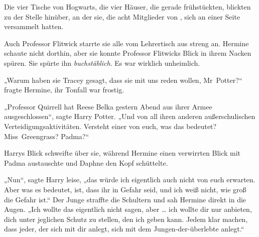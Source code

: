 Die vier Tische von Hogwarts, die vier Häuser, die gerade frühstückten, blickten zu der Stelle hinüber, an der sie, die acht Mitglieder von \SPHEW, sich an einer Seite versammelt hatten.

Auch Professor Flitwick starrte sie alle vom Lehrertisch aus streng an. Hermine schaute nicht dorthin, aber sie konnte Professor Flitwicks Blick in ihrem Nacken spüren. Sie spürte ihn \emph{buchstäblich}. Es war wirklich unheimlich.

„Warum haben sie Tracey gesagt, dass sie mit uns reden wollen, Mr~Potter?“ fragte Hermine, ihr Tonfall war frostig.

„Professor Quirrell hat Reese Belka gestern Abend aus ihrer Armee ausgeschlossen“, sagte Harry Potter.
„Und von all ihren anderen außerschulischen Verteidigungsaktivitäten. Versteht einer von euch, was das bedeutet? Miss~Greengrass? Padma?“

Harrys Blick schweifte über sie, während Hermine einen verwirrten Blick mit Padma austauschte und Daphne den Kopf schüttelte.

„Nun“, sagte Harry leise, „das würde ich eigentlich auch nicht von euch erwarten. Aber was es bedeutet, ist, dass ihr in Gefahr seid, und ich weiß nicht, wie groß die Gefahr ist.“ Der Junge straffte die Schultern und sah Hermine direkt in die Augen.
„Ich wollte das eigentlich nicht sagen, aber … ich wollte dir nur anbieten, dich unter jeglichen Schutz zu stellen, den ich geben kann. Jedem klar machen, dass jeder, der sich mit dir anlegt, sich mit dem Jungen-der-überlebte anlegt.“

